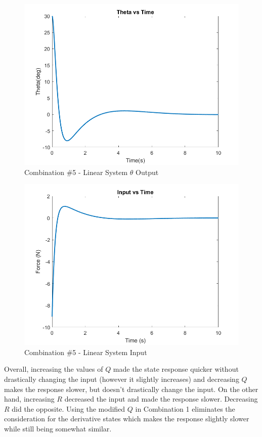 \begin{figure}[!ht]
    \centering
    \includegraphics[width=\linewidth]{figs/sf_lin_c5_theta.png}
    \caption{Combination $\#$5 - Linear System $\theta$ Output}
    \label{}
\end{figure}

\begin{figure}[!ht]
    \centering
    \includegraphics[width=\linewidth]{figs/sf_lin_c5_input.png}
    \caption{Combination $\#$5 - Linear System Input}
    \label{}
\end{figure}

\clearpage


Overall, increasing the values of $Q$ made the state response quicker without drastically changing the input (however it slightly increases) and decreasing $Q$ makes the response slower, but doesn't drastically change the input.  On the other hand, increasing $R$ decreased the input and made the response slower. Decreasing $R$ did the opposite. Using the modified $Q$ in Combination 1 eliminates the consideration for the derivative states which makes the response slightly slower while still being somewhat similar.